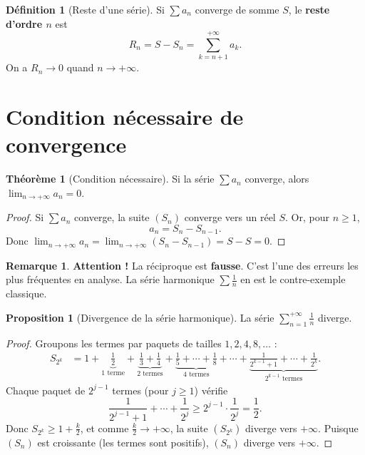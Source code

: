 \documentclass[12pt,a4paper,openany]{book}
\theoremstyle{definition}
\newtheorem{definition}{Définition}[chapter]
\newtheorem{theoreme}{Théorème}[chapter]
\newtheorem{proposition}{Proposition}[chapter]
\newtheorem{remarque}{Remarque}[chapter]
\begin{document}
\begin{definition}[Reste d'une série]\label{def:reste-serie}
  Si $\sum a_n$ converge de somme $S$, le \textbf{reste d'ordre $n$} est
  \[
    R_n = S - S_n = \sum_{k=n+1}^{+\infty} a_k.
  \]
  On a $R_n \to 0$ quand $n \to +\infty$.
\end{definition}

\section{Condition nécessaire de convergence}\label{sec:series:CN}

\begin{theoreme}[Condition nécessaire]\label{thm:CN-series}
  Si la série $\sum a_n$ converge, alors $\lim_{n \to +\infty} a_n = 0$.
\end{theoreme}

\begin{proof}
  Si $\sum a_n$ converge, la suite $(S_n)$ converge vers un réel $S$. Or,
  pour $n \geq 1$,
  \[
    a_n = S_n - S_{n-1}.
  \]
  Donc $\lim_{n \to +\infty} a_n = \lim_{n \to +\infty}(S_n - S_{n-1}) = S - S = 0$.
\end{proof}

\begin{remarque}\label{rem:CN-pas-CS}
  \textbf{Attention !} La réciproque est \textbf{fausse}. C'est l'une des erreurs les
  plus fréquentes en analyse. La série harmonique $\sum \frac{1}{n}$ en est le
  contre-exemple classique.
\end{remarque}

\begin{proposition}[Divergence de la série harmonique]\label{prop:harmonique-diverge}
  La série $\sum_{n=1}^{+\infty} \frac{1}{n}$ diverge.
\end{proposition}

\begin{proof}
  Groupons les termes par paquets de tailles $1, 2, 4, 8, \ldots$ :
  \begin{align*}
    S_{2^k}
      &= 1 + \underbrace{\frac{1}{2}}_{1\text{ terme}}
        + \underbrace{\frac{1}{3} + \frac{1}{4}}_{2\text{ termes}}
        + \underbrace{\frac{1}{5} + \cdots + \frac{1}{8}}_{4\text{ termes}}
        + \cdots
        + \underbrace{\frac{1}{2^{k-1}+1} + \cdots + \frac{1}{2^k}}_{2^{k-1}\text{ termes}}.
  \end{align*}
  Chaque paquet de $2^{j-1}$ termes (pour $j \geq 1$) vérifie
  \[
    \frac{1}{2^{j-1}+1} + \cdots + \frac{1}{2^j} \geq 2^{j-1} \cdot \frac{1}{2^j} = \frac{1}{2}.
  \]
  Donc $S_{2^k} \geq 1 + \frac{k}{2}$, et comme $\frac{k}{2} \to +\infty$,
  la suite $(S_{2^k})$ diverge vers $+\infty$. Puisque $(S_n)$ est croissante
  (les termes sont positifs), $(S_n)$ diverge vers $+\infty$.
\end{proof}
\end{document}
